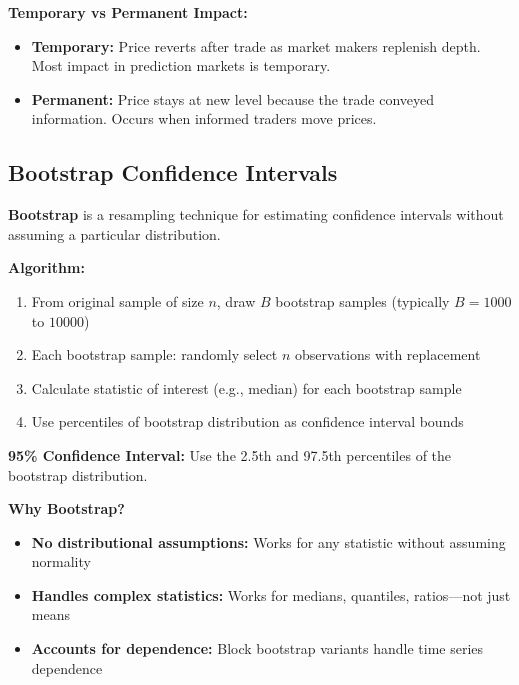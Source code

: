 \textbf{Temporary vs Permanent Impact:}
\begin{itemize}
    \item \textbf{Temporary:} Price reverts after trade as market makers replenish depth. Most impact in prediction markets is temporary.
    \item \textbf{Permanent:} Price stays at new level because the trade conveyed information. Occurs when informed traders move prices.
\end{itemize}

\subsection{Bootstrap Confidence Intervals}
\label{method:bootstrap-appendix}

\textbf{Bootstrap} is a resampling technique for estimating confidence intervals without assuming a particular distribution.

\textbf{Algorithm:}
\begin{enumerate}
    \item From original sample of size $n$, draw $B$ bootstrap samples (typically $B = 1000$ to $10000$)
    \item Each bootstrap sample: randomly select $n$ observations with replacement
    \item Calculate statistic of interest (e.g., median) for each bootstrap sample
    \item Use percentiles of bootstrap distribution as confidence interval bounds
\end{enumerate}

\textbf{95\% Confidence Interval:} Use the 2.5th and 97.5th percentiles of the bootstrap distribution.

\textbf{Why Bootstrap?}
\begin{itemize}
    \item \textbf{No distributional assumptions:} Works for any statistic without assuming normality
    \item \textbf{Handles complex statistics:} Works for medians, quantiles, ratios---not just means
    \item \textbf{Accounts for dependence:} Block bootstrap variants handle time series dependence
\end{itemize}

